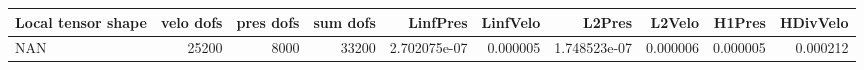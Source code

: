 \begin{tabular}{lrrrrrrrrr}
\toprule
Local tensor shape &  velo dofs &  pres dofs &  sum dofs &     LinfPres &  LinfVelo &       L2Pres &   L2Velo &   H1Pres &  HDivVelo \\
\midrule
               NAN &      25200 &       8000 &     33200 & 2.702075e-07 &  0.000005 & 1.748523e-07 & 0.000006 & 0.000005 &  0.000212 \\
\bottomrule
\end{tabular}
